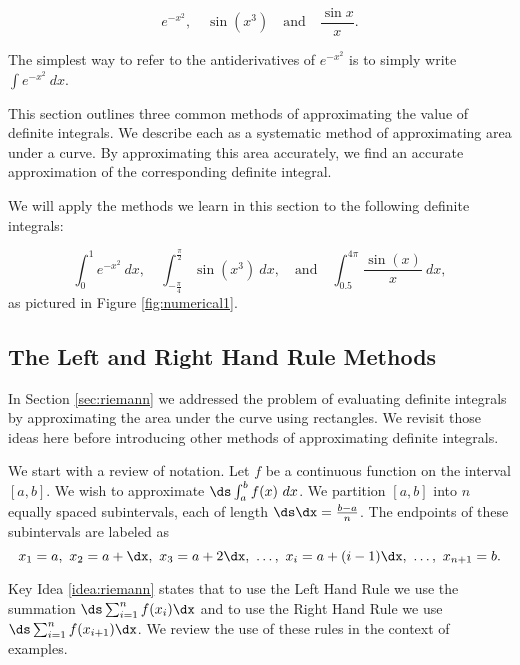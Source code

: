 $$
e^{-x^2}, \quad \sin(x^3)\quad \text{and} \quad \frac{\sin x}{x}.
$$

The simplest way to refer to the antiderivatives of $e^{-x^2}$ is to simply write $\int e^{-x^2}\ dx$. 

This section outlines three common methods of approximating the value of definite integrals. We describe each as a systematic method of approximating area under a curve. By approximating this area accurately, we find an accurate approximation of the corresponding definite integral.

We will apply the methods we learn in this section to the following definite integrals:

$$
\int_0^1 e^{-x^2} \ dx, \quad \int_{-\frac{\pi}{4}}^{\frac{\pi}{2}} \sin(x^3) \ dx, \quad \text{and} \quad \int_{0.5}^{4\pi} \frac{\sin(x)}{x} \ dx,
$$
as pictured in Figure \ref{fig:numerical1}.


\subsection*{The Left and Right Hand Rule Methods}

In Section \ref{sec:riemann} we addressed the problem of evaluating definite integrals by approximating the area under the curve using rectangles. We revisit those ideas here before introducing other methods of approximating definite integrals. 

We start with a review of notation. Let $f$ be a continuous function on the interval $[a,b]$. We wish to approximate $\ds \int_a^b f(x)\ dx$. We partition $[a,b]$ into $n$ equally spaced subintervals, each of length $\ds\dx = \frac{b-a}{n}$. The endpoints of these subintervals are labeled as $$x_1=a,\ x_2 = a+\dx,\ x_3 = a+ 2\dx,\ \ldots,\ x_i = a+(i-1)\dx,\ \ldots,\ x_{n+1} = b.$$

Key Idea \ref{idea:riemann} states that to use the Left Hand Rule we use the summation $\ds \sum_{i=1}^n f(x_i)\dx$ and to use the Right Hand Rule we use $\ds \sum_{i=1}^n f(x_{i+1})\dx$. We review the use of these rules in the context of examples.\\

